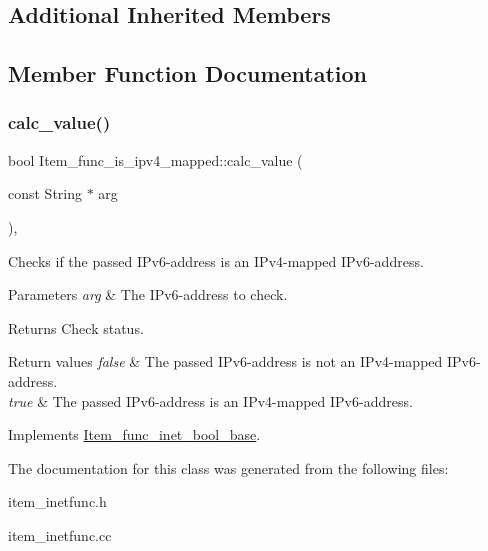 \subsection*{Additional Inherited Members}


\subsection{Member Function Documentation}
\mbox{\label{classItem__func__is__ipv4__mapped_a176329dc014077274a9468a5f84d1a23}} 
\subsubsection{\texorpdfstring{calc\+\_\+value()}{calc\_value()}}
{\footnotesize\ttfamily bool Item\+\_\+func\+\_\+is\+\_\+ipv4\+\_\+mapped\+::calc\+\_\+value (\begin{DoxyParamCaption}\item[{const String $\ast$}]{arg }\end{DoxyParamCaption})\hspace{0.3cm}{\ttfamily [protected]}, {\ttfamily [virtual]}}

Checks if the passed I\+Pv6-\/address is an I\+Pv4-\/mapped I\+Pv6-\/address.


\begin{DoxyParams}{Parameters}
{\em arg} & The I\+Pv6-\/address to check.\\
\hline
\end{DoxyParams}
\begin{DoxyReturn}{Returns}
Check status. 
\end{DoxyReturn}

\begin{DoxyRetVals}{Return values}
{\em false} & The passed I\+Pv6-\/address is not an I\+Pv4-\/mapped I\+Pv6-\/address. \\
\hline
{\em true} & The passed I\+Pv6-\/address is an I\+Pv4-\/mapped I\+Pv6-\/address. \\
\hline
\end{DoxyRetVals}


Implements \mbox{\hyperlink{classItem__func__inet__bool__base}{Item\+\_\+func\+\_\+inet\+\_\+bool\+\_\+base}}.



The documentation for this class was generated from the following files\+:\begin{DoxyCompactItemize}
\item 
item\+\_\+inetfunc.\+h\item 
item\+\_\+inetfunc.\+cc\end{DoxyCompactItemize}
